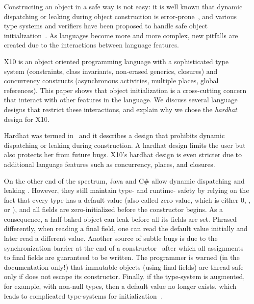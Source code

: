 Constructing an object in a safe way is not easy:
    it is well known that dynamic dispatching
    or leaking \this during object construction
    is error-prone~\cite{Dean:1996,Seo:2007:SBD:1522565.1522587,Gil:2009:WRS:1615184.1615216},
    and various type systems and verifiers have been proposed to
    handle safe object initialization~\cite{Hubert:2010:ESO:1888881.1888890,Zibin:2010:OIG:1869459.1869509,Fahndrich:2007:EOI:1297027.1297052,XinQi:2009}.
As languages become more and more complex,
    new pitfalls are created due to the interactions between
    language features.

X10 is an object oriented programming language with a sophisticated
    type system (constraints, class invariants, non-erased generics, closures)
    and concurrency constructs (asynchronous activities, multiple places, global references).
This paper shows that object initialization is a cross-cutting concern
    that interact with other features in the language.
We discuss several language designs that restrict these interactions,
    and explain why we chose the \emph{hardhat} design for X10.

{Hardhat} was termed in~\cite{Gil:2009:WRS:1615184.1615216}
    and it describes a design that prohibits dynamic dispatching or leaking \this during construction.
A hardhat design limits the user
    but also protects her from future bugs.
X10's hardhat design is even stricter due to additional language features
    such as concurrency, places, and closures.

On the other end of the spectrum,
    Java and C\# allow
    dynamic dispatching and leaking \this.
However, they still maintain type- and runtime- safety
    by relying on the fact that every type has a default value
    (also called zero value, which is either 0, , or ),
    and all fields are zero-initialized before the constructor begins.
As a consequence,
    a half-baked object can leak before all its fields are set. %
Phrased differently,
    when reading a final field, one can read the default value initially and later read a different value.
Another source of subtle bugs is due to the synchronization barrier
    at the end of a constructor~\cite{JSR133}
    after which all assignments to final fields are guaranteed to be written.
The programmer is warned (in the documentation only!)
    that immutable objects (using final fields) are thread-safe only if
    \this does not escape its constructor.
Finally, if the type-system is augmented, for example, with non-null types, then
    a default value no longer exists,
    which leads to complicated type-systems for initialization~\cite{Fahndrich:2007:EOI:1297027.1297052,XinQi:2009}.

